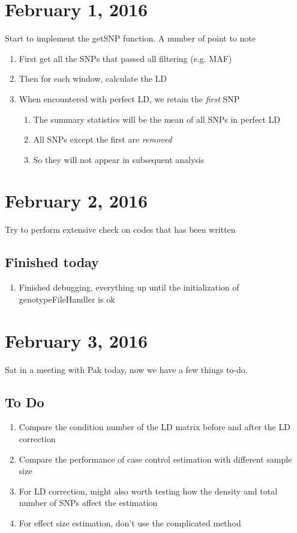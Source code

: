\documentclass[12pt]{article}
\begin{document}
	\section{February 1, 2016}
	Start to implement the getSNP function. 
	A number of point to note
	\begin{enumerate}
		\item First get all the SNPs that passed all filtering (e.g. MAF)
		\item Then for each window, calculate the LD
		\item When encountered with perfect LD, we retain the \emph{first} SNP
		\begin{enumerate}
			\item The summary statistics will be the mean of all SNPs in perfect LD
			\item All SNPs except the first are \emph{removed} 
			\item So they will not appear in subsequent analysis
		\end{enumerate}
	\end{enumerate}
	
	\section{February 2, 2016}
	Try to perform extensive check on codes that has been written
	\subsection{Finished today}
	\begin{enumerate}
		\item Finished debugging, everything up until the initialization of genotypeFileHandler is ok
	\end{enumerate}
	\section{February 3, 2016}
	Sat in a meeting with Pak today, now we have a few things to-do.
	\subsection{To Do}
	\begin{enumerate}
		\item Compare the condition number of the LD matrix before and after the LD correction
		\item Compare the performance of case control estimation with different sample size 
		\item For LD correction, might also worth testing how the density and total number of SNPs affect the estimation
		\item For effect size estimation, don't use the complicated method
	\end{enumerate}
\end{document}
